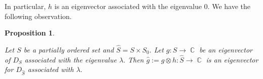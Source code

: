 \documentclass[11pt,a4paper]{amsart}
\newcommand{\jon}[1]{{\color{purple}#1}}
\newtheorem{prop}[thm]{Proposition}
\theoremstyle{definition}
\DeclareMathOperator{\C}{\mathbb{C}}
\numberwithin{equation}{section}
\begin{document}
In particular, $h$ is an eigenvector associated with the eigenvalue $0.$ We have the following observation. 


\begin{prop} \label{prop:second_proof}

Let $S$ be a partially ordered set and $\widehat{S} = S \times S_0.$ Let $g: S \to \C$ be an eigenvector of $D_S$ associated with the eigenvalue $\lambda.$ Then $\widehat{g}:=g \otimes h: \widehat{S} \to \C$ is an eigenvector for $D_{\widehat{S}}$ associated with $\lambda.$

\end{prop}
\end{document}
